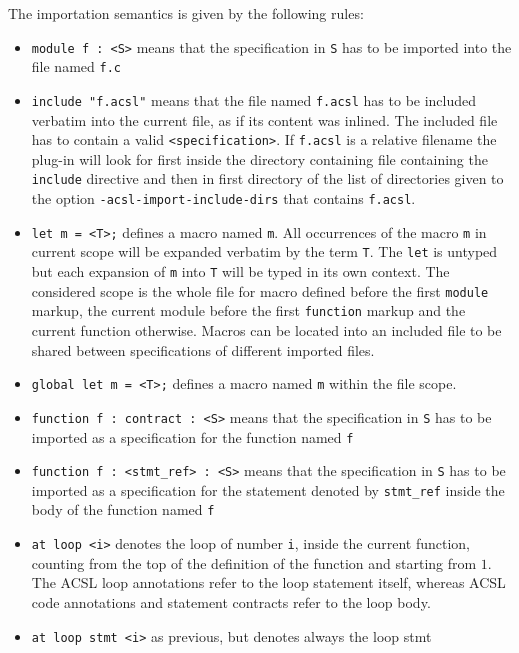 \documentclass{frama-c-book}
\begin{document}
The importation semantics is given by the following rules:
\begin{itemize}
  \item \verb|module f : <S>| means that the specification in \verb|S|
    has to be imported into the \C file named \verb|f.c|
  \item \verb|include "f.acsl"| means that the file named
    \verb|f.acsl| has to be included verbatim into the current file,
    as if its content was inlined.
    The included file has to contain a valid \verb|<specification>|.
    If \verb|f.acsl| is a relative filename the plug-in will look for
    first inside the directory containing file containing the
    \verb|include| directive and then in first directory of the list
    of directories given to the option \verb|-acsl-import-include-dirs| that
    contains \verb|f.acsl|.
  \item \verb|let m = <T>;| defines a macro named \verb|m|. All
    occurrences of the macro \verb|m| in current scope
    will be expanded verbatim by the \acsl term \verb|T|. The
    \verb|let| is untyped but each expansion of \verb|m| into \verb|T|
    will be typed in its own context.
    The considered scope is the whole file for macro defined before the
    first \verb|module| markup, the current module before the first
    \verb|function| markup and the current function otherwise.
    Macros can be located into an included file to be shared between
    specifications of different imported files.
  \item \verb|global let m = <T>;| defines a macro named \verb|m|
    within the file scope.
  \item \verb|function f : contract : <S>| means that the
    specification in \verb|S| has to be imported as a specification
    for the \C function named \verb|f|
  \item \verb|function f : <stmt_ref> : <S>| means that the
    specification in \verb|S| has to be imported as a specification
    for the statement denoted by \verb|stmt_ref| inside the body of
    the \C function named \verb|f|
  \item \verb|at loop <i>| denotes the loop of number \verb|i|,
    inside the current function, counting from the top of the definition
    of the function and starting from $1$.
    The ACSL loop annotations refer to the loop statement itself,  whereas
    ACSL code annotations and statement contracts refer to the loop body.
  \item \verb|at loop stmt <i>| as previous, but denotes always the loop stmt

\end{itemize}
\end{document}
